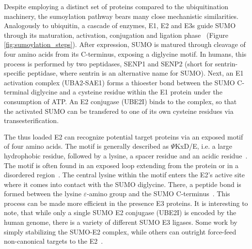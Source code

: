 Despite employing a distinct set of proteins compared to the ubiquitination machinery, the sumoylation pathway bears many close mechanistic similarities. Analogously to ubiquitin, a cascade of enzymes, E1, E2 and E3s guide SUMO through its maturation, activation, conjugation and ligation phase~\cite{geiss-friedlander_concepts_2007} (Figure \ref{fig:sumoylation_steps}). After expression, SUMO is matured through cleavage of four amino acids from its C-terminus, exposing a diglycine motif. In humans, this process is performed by two peptidases, SENP1 and SENP2 (short for sentrin-specific peptidase, where sentrin is an alternative name for SUMO). Next, an E1 activation complex (UBA2-SAE1) forms a thioester bond between the SUMO C-terminal diglycine and a cysteine residue within the E1 protein under the consumption of ATP. An E2 conjugase (UBE2I) binds to the complex, so that the activated SUMO can be transfered to one of its own cysteine residues via transesterification. 

The thus loaded E2 can recognize potential target proteins via an exposed motif of four amino acids. The motif is generally described as $\Psi$KxD/E, i.e. a large hydrophobic residue, followed by a lysine, a spacer residue and an acidic residue~\cite{sampson_small_2001}. The motif is often found in an exposed loop extending from the protein or in a disordered region~\cite{bernier-villamor_structural_2002,macauley_beads---string_2006,geiss-friedlander_concepts_2007}. The central lysine within the motif enters the E2's active site where it comes into contact with the SUMO diglycine. There, a peptide bond is formed between the lysine $\varepsilon$-amino group and the SUMO C-terminus~\cite{bernier-villamor_structural_2002}. This process can be made more efficient in the presence E3 proteins. It is interesting to note, that while only a single SUMO E2 conjugase (UBE2I) is encoded by the human genome, there is a variety of different SUMO E3 ligases. Some work by simply stabilizing the SUMO-E2 complex, while others can outright force-feed non-canonical targets to the E2~\cite{streich_jr_capturing_2016}. 

